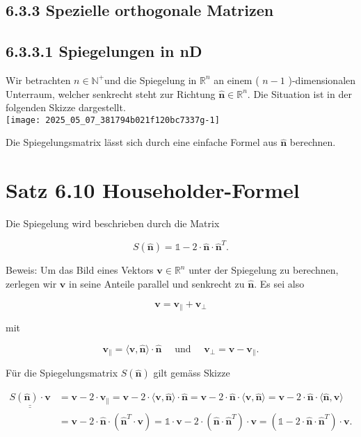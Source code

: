 \documentclass[10pt]{article}
\begin{document}
\subsection*{6.3.3 Spezielle orthogonale Matrizen}
\subsection*{6.3.3.1 Spiegelungen in nD}
Wir betrachten $n \in \mathbb{N}^{+}$und die Spiegelung in $\mathbb{R}^{n}$ an einem ( $n-1$ )-dimensionalen Unterraum, welcher senkrecht steht zur Richtung $\hat{\mathbf{n}} \in \mathbb{R}^{n}$. Die Situation ist in der folgenden Skizze dargestellt.\\
\texttt{[image: 2025\_05\_07\_381794b021f120bc7337g-1]}

Die Spiegelungsmatrix lässt sich durch eine einfache Formel aus $\hat{\mathbf{n}}$ berechnen.

\section*{Satz 6.10 Householder-Formel}
Die Spiegelung wird beschrieben durch die Matrix


\begin{equation*}
S(\hat{\mathbf{n}})=\mathbb{1}-2 \cdot \hat{\mathbf{n}} \cdot \hat{\mathbf{n}}^{T} . \tag{6.74}
\end{equation*}


Beweis: Um das Bild eines Vektors $\mathbf{v} \in \mathbb{R}^{n}$ unter der Spiegelung zu berechnen, zerlegen wir $\mathbf{v}$ in seine Anteile parallel und senkrecht zu $\hat{\mathbf{n}}$. Es sei also


\begin{equation*}
\mathbf{v}=\mathbf{v}_{\|}+\mathbf{v}_{\perp} \tag{6.75}
\end{equation*}


mit


\begin{equation*}
\mathbf{v}_{\|}=\langle\mathbf{v}, \hat{\mathbf{n}}\rangle \cdot \hat{\mathbf{n}} \quad \text { und } \quad \mathbf{v}_{\perp}=\mathbf{v}-\mathbf{v}_{\|} . \tag{6.76}
\end{equation*}


Für die Spiegelungsmatrix $S(\hat{\mathbf{n}})$ gilt gemäss Skizze


\begin{align*}
\underline{\underline{S(\hat{\mathbf{n}}) \cdot \mathbf{v}}} & =\mathbf{v}-2 \cdot \mathbf{v}_{\|}=\mathbf{v}-2 \cdot\langle\mathbf{v}, \hat{\mathbf{n}}\rangle \cdot \hat{\mathbf{n}}=\mathbf{v}-2 \cdot \hat{\mathbf{n}} \cdot\langle\mathbf{v}, \hat{\mathbf{n}}\rangle=\mathbf{v}-2 \cdot \hat{\mathbf{n}} \cdot\langle\hat{\mathbf{n}}, \mathbf{v}\rangle \\
& =\mathbf{v}-2 \cdot \hat{\mathbf{n}} \cdot\left(\hat{\mathbf{n}}^{T} \cdot \mathbf{v}\right)=\mathbb{1} \cdot \mathbf{v}-2 \cdot\left(\hat{\mathbf{n}} \cdot \hat{\mathbf{n}}^{T}\right) \cdot \mathbf{v}=\left(\mathbb{1}-2 \cdot \hat{\mathbf{n}} \cdot \hat{\mathbf{n}}^{T}\right) \cdot \mathbf{v} . \tag{6.77}
\end{align*}
\end{document}
